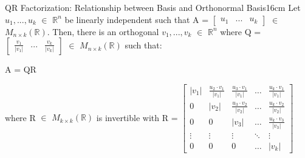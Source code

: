     \begin{wtheorem}{QR Factorization: Relationship between Basis and
    Orthonormal Basis}{16cm}
        Let $u_1,...,u_k$ $\in$ $\mathbb{R}^n$
        be linearly independent such that A =
        $\begin{bmatrix}
            u_1 & ... & u_k
        \end{bmatrix}$
        $\in$ $M_{n \times k}(\mathbb{R})$.
        Then, there is an orthogonal $v_1,...,v_k$ $\in$ $\mathbb{R}^n$
        where Q =
        $\begin{bmatrix}
            \frac{v_1}{|v_1|} & ... & \frac{v_k}{|v_k|}
        \end{bmatrix}$
        $\in$ $M_{n \times k}(\mathbb{R})$ such that:

        \hspace{0.5cm}
        A = QR

        where R $\in$ $M_{k \times k}(\mathbb{R})$ is invertible with
        R =
        \footnotesize
        $\begin{bmatrix}
            |v_1| & \frac{u_2 \cdot v_1}{|v_1|} & \frac{u_3 \cdot v_1}{|v_1|}
                & \hdots & \frac{u_k \cdot v_1}{|v_1|} \\
            0 & |v_2| & \frac{u_3 \cdot v_2}{|v_2|}
                & \hdots & \frac{u_k \cdot v_2}{|v_2|} \\
            0 & 0 & |v_3|
                & \hdots & \frac{u_k \cdot v_3}{|v_3|} \\
            \vdots & \vdots & \vdots & \ddots & \vdots \\
            0 & 0 & 0 & \hdots & |v_k|
        \end{bmatrix}$
    \end{wtheorem}


